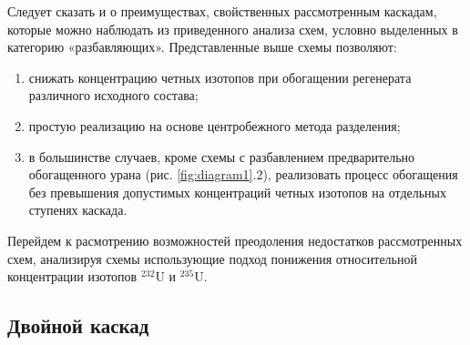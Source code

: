 Следует сказать и о преимуществах, свойственных рассмотренным каскадам, которые можно наблюдать из приведенного анализа схем, условно выделенных в категорию «разбавляющих». Представленные выше схемы позволяют:
\begin{enumerate}
  \item снижать концентрацию четных изотопов при обогащении регенерата различного исходного состава;
  \item	простую реализацию на основе центробежного метода разделения;
  \item в большинстве случаев, кроме схемы с разбавлением предварительно обогащенного урана (рис. \ref{fig:diagram1}.2), реализовать процесс обогащения без превышения допустимых концентраций четных изотопов на отдельных ступенях каскада.
\end{enumerate}

Перейдем к расмотрению возможностей преодоления недостатков рассмотренных схем, анализируя схемы использующие подход понижения относительной концентрации изотопов  $^{232}$U и $^{235}$U.

\subsection{Двойной каскад}

